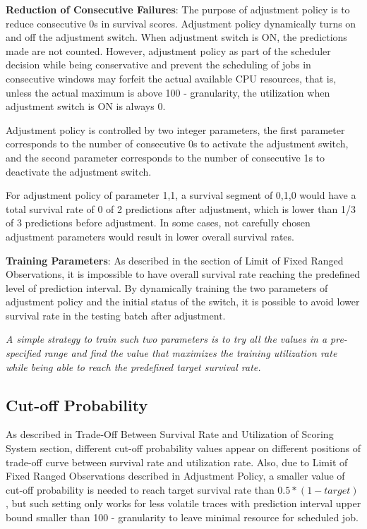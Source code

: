 \documentclass{article}
\begin{document}
\begin{flushleft}
\textbf{Reduction of Consecutive Failures}: The purpose of adjustment policy is to reduce consecutive 0s in survival scores. Adjustment policy dynamically turns on and off the adjustment switch. When adjustment switch is ON, the predictions made are not counted. However, adjustment policy as part of the scheduler decision while being conservative and prevent the scheduling of jobs in consecutive windows may forfeit the actual available CPU resources, that is, unless the actual maximum is above 100 - granularity, the utilization when adjustment switch is ON is always 0.

Adjustment policy is controlled by two integer parameters, the first parameter corresponds to the number of consecutive 0s to activate the adjustment switch, and the second parameter corresponds to the number of consecutive 1s to deactivate the adjustment switch.

For adjustment policy of parameter 1,1, a survival segment of 0,1,0 would have a total survival rate of 0 of 2 predictions after adjustment, which is lower than 1/3 of 3 predictions before adjustment. In some cases, not carefully chosen adjustment parameters would result in lower overall survival rates. 
\end{flushleft}

\begin{flushleft}
\textbf{Training Parameters}: As described in the section of Limit of Fixed Ranged Observations, it is impossible to have overall survival rate reaching the predefined level of prediction interval. By dynamically training the two parameters of adjustment policy and the initial status of the switch, it is possible to avoid lower survival rate in the testing batch after adjustment.

\textit{A simple strategy to train such two parameters is to try all the values in a pre-specified range and find the value that maximizes the training utilization rate while being able to reach the predefined target survival rate.}
\end{flushleft}

\subsection{Cut-off Probability}

\begin{flushleft}
As described in Trade-Off Between Survival Rate and Utilization of Scoring System section, different cut-off probability values appear on different positions of trade-off curve between survival rate and utilization rate. Also, due to Limit of Fixed Ranged Observations described in Adjustment Policy, a smaller value of cut-off probability is needed to reach target survival rate than $0.5 * (1 - target)$, but such setting only works for less volatile traces with prediction interval upper bound smaller than 100 - granularity to leave minimal resource for scheduled job.
\end{flushleft}
\end{document}
